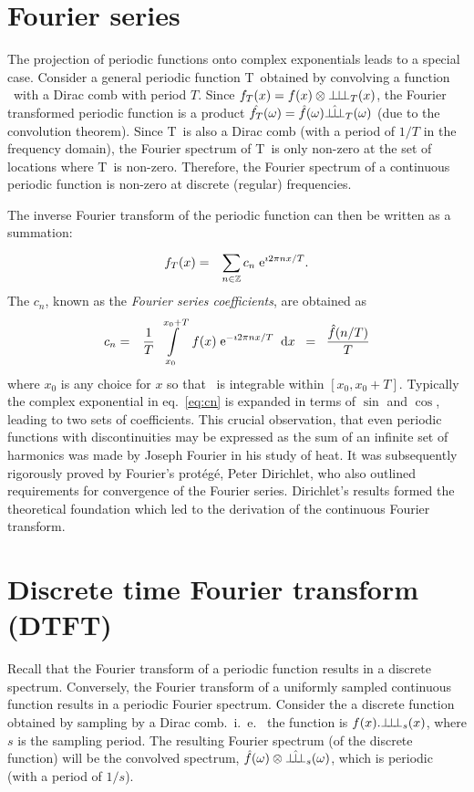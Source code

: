 \section{Fourier series}
The projection of periodic functions onto complex exponentials leads to a special case. Consider a general periodic function \ipn T\ obtained by convolving a function \ifn\ with a Dirac comb  with period $T$. Since $f_{T}(x) = f(x)  \otimes {\bot\hspace{-.7ex}\bot\hspace{-.7ex}\bot}_{T}(x)$, the Fourier transformed periodic function is a product $\hat{f_{T}}(\omega) = \hat{f}(\omega) \hat{{\bot\hspace{-.8ex}\bot\hspace{-.8ex}\bot}}_{T}(\omega)$ (due to the convolution theorem). Since \SHAF T\ is also a Dirac comb (with a period of $1/T$ in the frequency domain), the Fourier spectrum of \ipn T\ is only non-zero at the set of locations where \SHAF T\ is non-zero. Therefore, the Fourier spectrum of a continuous periodic function is non-zero at discrete (regular) frequencies.

The inverse Fourier transform of the periodic function can then be written as a summation:
\begin{eqnarray}
  f_{T}(x) & = & \sum\limits_{n\in\mathbb{Z}}^{} c_n \; \mathrm{e}^{\mathrm{\imath} 2\pi n x / T}.
\end{eqnarray}
The $c_n$, known as the \textit{Fourier series coefficients}, are obtained as 
\begin{eqnarray}
\label{eq:cn}  c_n & = & \frac 1 T \; \displaystyle\int\limits_{x_0}^{x_0+T} \; f(x) \; \mathrm{e}^{- \mathrm{\imath} 2\pi n x / T} \;\; \mathrm{d}x \;\; = \;\; \frac {\hat{f} (n/T)} T
\end{eqnarray}
where $x_0$ is any choice for $x$ so that \ifn\ is integrable within $[x_0, x_0+T]$. Typically the complex exponential in eq.~\ref{eq:cn} is expanded in terms of $\sin{}$ and $\cos{}$, leading to two sets of coefficients. This crucial observation, that even periodic functions with discontinuities may be expressed as the sum of an infinite set of harmonics was made by Joseph Fourier in his study of heat. It was subsequently rigorously proved by Fourier's prot\'eg\'e, Peter Dirichlet, who also outlined requirements for convergence of the Fourier series. Dirichlet's results formed the theoretical foundation which led to the derivation of the continuous Fourier transform. 


\section{Discrete time Fourier transform (DTFT)}
Recall that the Fourier transform of a periodic function results in a discrete spectrum. Conversely, the Fourier transform of a uniformly sampled continuous function results in a periodic Fourier spectrum. Consider the a discrete function obtained by sampling by a Dirac comb.~i.~e.~ the function is $f(x) . {\bot\hspace{-.7ex}\bot\hspace{-.7ex}\bot}_{s}(x)$, where $s$ is the sampling period. The resulting Fourier spectrum (of the discrete function) will be the convolved spectrum, $\hat{f}(\omega) \otimes \hat{{\bot\hspace{-.8ex}\bot\hspace{-.8ex}\bot}}_{s}(\omega)$, which is periodic (with a period of $1/s$).


